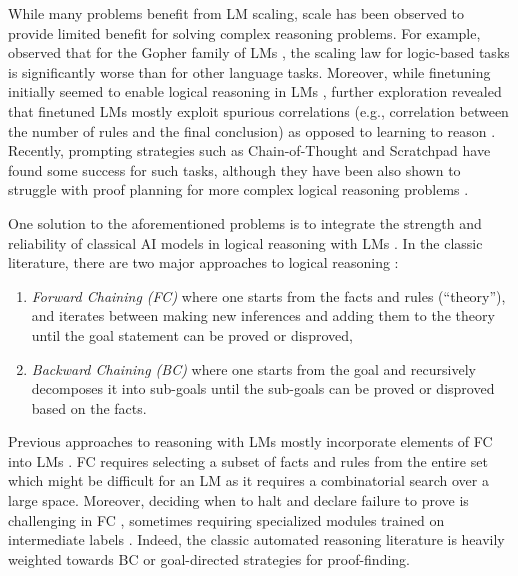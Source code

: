 \documentclass[11pt]{article}
\begin{document}
While many problems benefit from LM scaling, scale has been observed to provide limited benefit for solving complex reasoning problems. For example, \citet{creswell2022selection} observed that for the Gopher family of LMs \citep{rae2021scaling}, the scaling law for logic-based tasks is significantly worse than for other language tasks. 
Moreover, while finetuning initially seemed to enable logical reasoning in LMs \cite{clark2020transformers,tafjord2020proofwriter}, further exploration revealed that finetuned LMs mostly exploit spurious correlations 
(e.g., correlation between the number of rules and the final conclusion) 
as opposed to learning to reason \cite{zhang2022paradox,schlegel2022can,liu2022transformers}.
Recently, prompting strategies such as Chain-of-Thought \cite{wei2022chain} and Scratchpad \citep{nye2022show} have found some success for such tasks, although they have been also shown to struggle with proof planning for more complex logical reasoning problems \cite{saparov2022language}.

One solution to the aforementioned problems is to integrate the strength and reliability of classical AI models in logical reasoning with LMs \cite{garcez2020neurosymbolic,marcus2020next}.
In the classic literature, there are two major approaches to logical reasoning \cite{poole2010artificial}: 
\begin{enumerate}[nosep]
    \item \emph{Forward Chaining (FC)} where one starts from the facts and rules (``theory''), and iterates between making new inferences and adding them to the theory until the goal statement can be proved or disproved,
    \item \emph{Backward Chaining (BC)} where one starts from the goal and recursively decomposes it into sub-goals until the sub-goals can be proved or disproved based on the facts.
\end{enumerate}  
Previous approaches to reasoning with LMs mostly incorporate elements of FC into LMs \cite{tafjord2020proofwriter,creswell2022selection}. FC requires selecting a subset of facts and rules from the entire set which might be difficult for an LM as it requires a combinatorial search over a large space. 
Moreover, deciding when to halt and declare failure to prove is challenging in FC \cite{creswell2022selection}, sometimes requiring specialized modules trained on intermediate labels \cite{creswell2022faithful}. Indeed, the classic automated reasoning literature is heavily weighted towards BC or goal-directed  strategies for proof-finding. 
\end{document}
